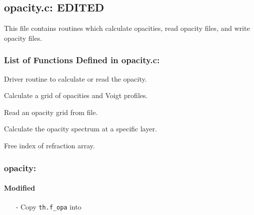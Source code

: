 \documentclass[letterpaper,12pt]{article}
\begin{document}
\newpage
\subsection{opacity.c: EDITED}
This file contains routines which calculate opacities, read opacity files, and write opacity files.
\subsubsection{List of Functions Defined in opacity.c:}
Driver routine to calculate or read the opacity. \newline

Calculate a grid of opacities and Voigt profiles. \newline

Read an opacity grid from file. \newline

Calculate the opacity spectrum at a specific layer. \newline

Free index of refraction array. \newline

\subsubsection{opacity:}
\paragraph{Modified}
\begin{enumerate}[leftmargin=10pt, noitemsep, parsep=0pt, topsep=0ex]
\item[-] Copy {\tt th.f\_opa} into 
\end{enumerate}
\end{document}

